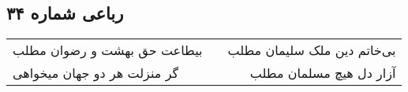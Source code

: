 \begin{center}
\section*{رباعی شماره ۳۴}
\label{sec:sh034}
\begin{longtable}{l p{0.5cm} r}
بیطاعت حق بهشت و رضوان مطلب
&&
بی‌خاتم دین ملک سلیمان مطلب
\\
گر منزلت هر دو جهان میخواهی
&&
آزار دل هیچ مسلمان مطلب
\\
\end{longtable}
\end{center}
